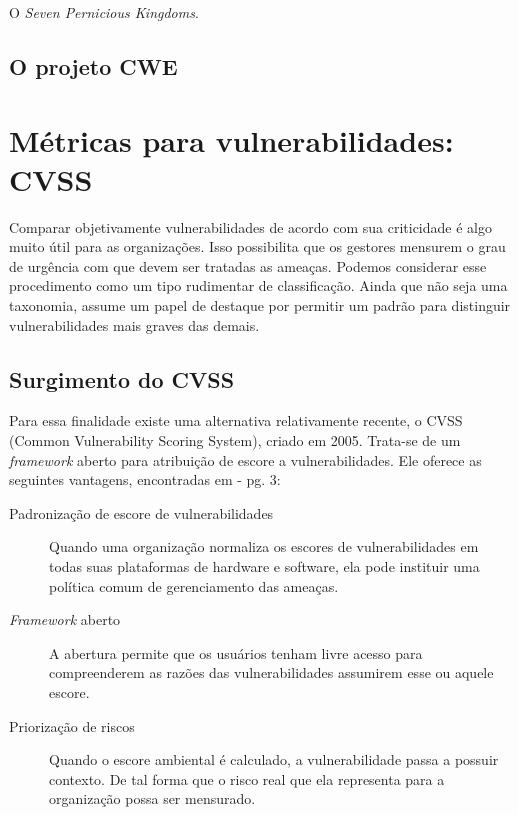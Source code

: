 			O \textsl{Seven Pernicious Kingdoms}.
		
		\subsection{O projeto CWE}
						

			

	\section{Métricas para vulnerabilidades: CVSS}
		Comparar objetivamente vulnerabilidades de acordo com sua criticidade é
		algo muito útil para as organizações.
		Isso possibilita que os gestores mensurem o grau de urgência com que devem
		ser tratadas as ameaças. Podemos considerar esse procedimento
		como um tipo rudimentar de classificação. Ainda que não seja uma taxonomia,
		assume um papel de destaque por permitir um padrão para distinguir
		vulnerabilidades mais graves das demais.

		\subsection{Surgimento do CVSS}
			Para essa finalidade existe uma alternativa relativamente recente, o CVSS
			(Common Vulnerability Scoring System), criado em 2005. 
			Trata-se de um \textsl{framework} aberto para atribuição de escore a vulnerabilidades.
			Ele oferece as seguintes vantagens, encontradas em \cite{Mell2007} - pg. 3:
			\begin{description}
				\item[Padronização de escore de vulnerabilidades]{Quando uma organização normaliza
				os escores de vulnerabilidades em todas suas plataformas de hardware e software,
				ela pode instituir uma política comum de gerenciamento das ameaças.}
				\item[\textsl{Framework} aberto]{A abertura permite que os usuários tenham
				livre acesso para compreenderem as razões das vulnerabilidades assumirem
				esse ou aquele escore.}
				\item[Priorização de riscos]{Quando o escore ambiental é calculado, a vulnerabilidade
				passa a possuir contexto. De tal forma que o risco real que ela representa
				para a organização possa ser mensurado.}
			\end{description}

